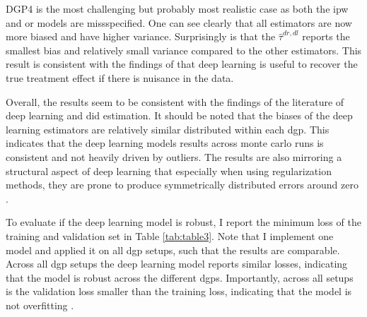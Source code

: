 DGP4 is the most challenging but probably most realistic case as both the \ac{ipw} and \ac{or} models are missspecified.
One can see clearly that all estimators are now more biased and have higher variance.
Surprisingly is that the $\hat{\tau}^{dr,dl}$ reports the smallest bias and relatively small variance compared to the other estimators.
This result is consistent with the findings of \citet{belloni2017program,chernozhukovDoubleDebiasedMachine2018,farrellDeepNeuralNetworks2021} that deep learning is useful to recover the true treatment effect if there is nuisance in the data.



Overall, the results seem to be consistent with the findings of the literature of deep learning and \ac{did} estimation.
It should be noted that the biases of the deep learning estimators are relatively similar distributed within each \ac{dgp}.
This indicates that the deep learning models results across monte carlo runs is consistent and not heavily driven by outliers.
The results are also mirroring a structural aspect of deep learning that especially when using regularization methods, they are prone to produce symmetrically distributed errors around zero \citep{koh2017understanding}.

To evaluate if the deep learning model is robust, I report the minimum loss of the training and validation set in Table \ref{tab:table3}.
Note that I implement one model and applied it on all \ac{dgp} setups, such that the results are comparable.
Across all \ac{dgp} setups the deep learning model reports similar losses, indicating that the model is robust across the different \ac{dgp}s.
Importantly, across all setups is the validation loss smaller than the training loss, indicating that the model is not overfitting \citep[see][]{Goodfellow-et-al-2016,farrellDeepNeuralNetworks2021}.






